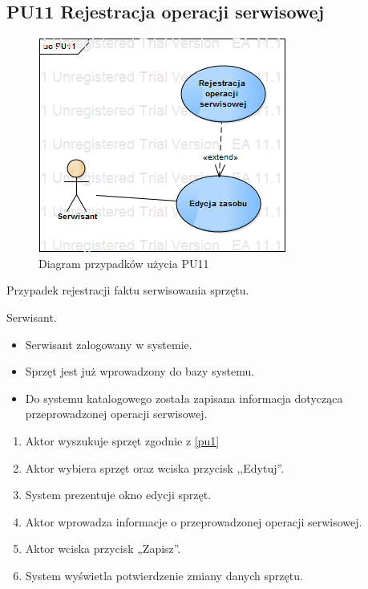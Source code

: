 \subsection{PU11 Rejestracja operacji serwisowej} \label{pu11}
\begin{figure}[h!]
	\centering
	\includegraphics[scale=0.6]{img/diagrams/useCaseDiagrams/PU11.png}
	\caption{Diagram przypadków użycia PU11 \label{fig:labelUCPU11}}
\end{figure}

Przypadek rejestracji faktu serwisowania sprzętu.

Serwisant.

\begin{itemize}
\item Serwisant zalogowany w systemie.
\item Sprzęt jest już wprowadzony do bazy systemu.
\end{itemize}

\begin{itemize}
\item Do systemu katalogowego została zapisana informacja dotycząca przeprowadzonej operacji serwisowej.
\end{itemize}

\begin{enumerate}
	\item \label{pu11:1} Aktor wyszukuje sprzęt zgodnie z \ref{pu1}
	\item \label{pu11:2} Aktor wybiera sprzęt oraz wciska przycisk ,,Edytuj''.
	\item System prezentuje okno edycji sprzęt.
	\item Aktor wprowadza informacje o przeprowadzonej operacji serwisowej.
	\item Aktor wciska przycisk „Zapisz”.
	\item System wyświetla potwierdzenie zmiany danych sprzętu.
\end{enumerate}

